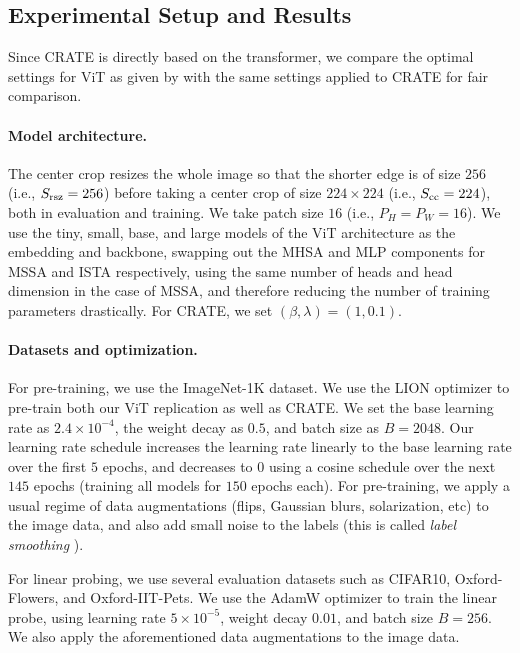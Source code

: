 \documentclass[../../book-main.tex]{subfiles}
\begin{document}
\subsection{Experimental Setup and Results}\label{sub:image_classification_experiments}

Since CRATE is directly based on the transformer, we compare the optimal settings for ViT as given by \cite{dosovitskiy2020image,touvron2020training} with the same settings applied to CRATE for fair comparison.

\paragraph{Model architecture.} The center crop resizes the whole image so that the shorter edge is of size \(256\) (i.e., \(S_{\mathrm{rsz}} = 256\)) before taking a center crop of size \(224 \times 224\) (i.e., \(S_{\mathrm{cc}} = 224\)), both in evaluation and training. We take patch size \(16\) (i.e., \(P_{H} = P_{W} = 16\)). We use the tiny, small, base, and large models of the ViT \cite{dosovitskiy2020image} architecture as the embedding and backbone, swapping out the MHSA and MLP components for MSSA and ISTA respectively, using the same number of heads and head dimension in the case of MSSA, and therefore reducing the number of training parameters drastically. For CRATE, we set \((\beta, \lambda) = (1, 0.1)\).

\paragraph{Datasets and optimization.} For pre-training, we use the ImageNet-1K dataset. We use the LION optimizer \citep{chen2024symbolic} to pre-train both our ViT replication as well as CRATE. We set the base learning rate as \(2.4 \times 10^{-4}\), the weight decay as \(0.5\), and batch size as \(B = 2048\). Our learning rate schedule increases the learning rate linearly to the base learning rate over the first \(5\) epochs, and decreases to \(0\) using a cosine schedule over the next \(145\) epochs (training all models for \(150\) epochs each). For pre-training, we apply a usual regime of data augmentations (flips, Gaussian blurs, solarization, etc) to the image data, and also add small noise to the labels (this is called \textit{label smoothing} \citep{muller2019does}).

For linear probing, we use several evaluation datasets such as CIFAR10, Oxford-Flowers, and Oxford-IIT-Pets. We use the AdamW optimizer to train the linear probe, using learning rate \(5 \times 10^{-5}\), weight decay \(0.01\), and batch size \(B = 256\). We also apply the aforementioned data augmentations to the image data.
\end{document}
